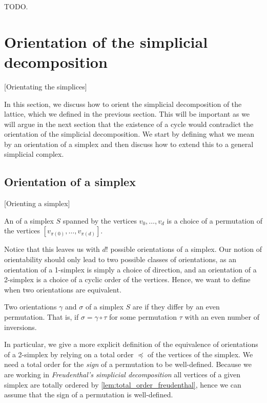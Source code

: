 TODO.

\section{Orientation of the simplicial decomposition}[Orientating the simplices]

In this section, we discuss how to orient the simplicial decomposition of the lattice, which we defined in the previous section. This will be important as we will argue in the next section that the existence of a cycle would contradict the orientation of the simplicial decomposition. We start by defining what we mean by an orientation of a simplex and then discuss how to extend this to a general simplicial complex.

\subsection{Orientation of a simplex}[Orienting a simplex]
\label{sec:orientation_of_simplex}

\begin{definition}
	An  of a simplex $S$ spanned by the vertices $v_0, \dots, v_d$ is a choice of a permutation of the vertices $[v_{\pi(0)}, \dots, v_{\pi(d)}]$.
\end{definition}

Notice that this leaves us with $d!$ possible orientations of a simplex. Our notion of orientability should only lead to two possible classes of orientations, as an orientation of a 1-simplex is simply a choice of direction, and an orientation of a 2-simplex is a choice of a cyclic order of the vertices. Hence, we want to define when two orientations are equivalent.

\begin{definition}
	Two orientations $\gamma$ and $\sigma$ of a simplex $S$ are  if they differ by an even permutation. That is, if $\sigma = \gamma \circ \tau$ for some permutation $\tau$ with an even number of inversions.
\end{definition}

In particular, we give a more explicit definition of the equivalence of orientations of a 2-simplex by relying on a total order $\preceq$ of the vertices of the simplex. We need a total order for the \emph{sign} of a permutation to be well-defined. Because we are working in \emph{Freudenthal's simplicial decomposition} all vertices of a given simplex are totally ordered by \cref{lem:total_order_freudenthal}, hence we can assume that the sign of a permutation is well-defined.

